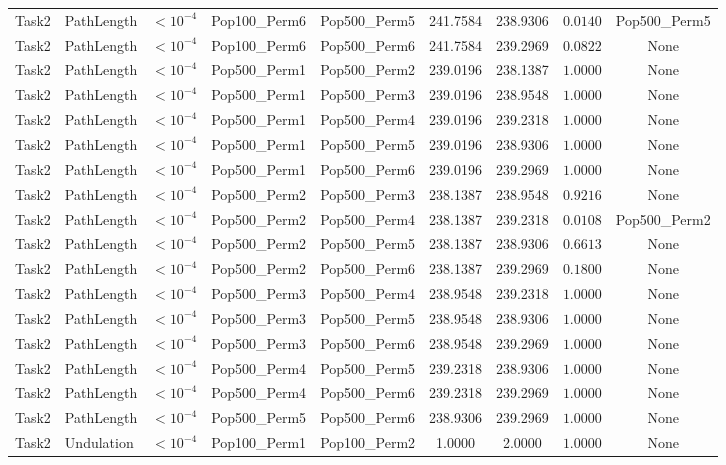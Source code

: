 \documentclass[8pt]{article}
\begin{document}
\begin{longtable}{llccccccc}
Task2 & PathLength & $< 10^{-4}$ & Pop100\_Perm6 & Pop500\_Perm5 & 241.7584 & 238.9306 & $0.0140$ & Pop500\_Perm5 \\
Task2 & PathLength & $< 10^{-4}$ & Pop100\_Perm6 & Pop500\_Perm6 & 241.7584 & 239.2969 & $0.0822$ & None \\
Task2 & PathLength & $< 10^{-4}$ & Pop500\_Perm1 & Pop500\_Perm2 & 239.0196 & 238.1387 & $1.0000$ & None \\
Task2 & PathLength & $< 10^{-4}$ & Pop500\_Perm1 & Pop500\_Perm3 & 239.0196 & 238.9548 & $1.0000$ & None \\
Task2 & PathLength & $< 10^{-4}$ & Pop500\_Perm1 & Pop500\_Perm4 & 239.0196 & 239.2318 & $1.0000$ & None \\
Task2 & PathLength & $< 10^{-4}$ & Pop500\_Perm1 & Pop500\_Perm5 & 239.0196 & 238.9306 & $1.0000$ & None \\
Task2 & PathLength & $< 10^{-4}$ & Pop500\_Perm1 & Pop500\_Perm6 & 239.0196 & 239.2969 & $1.0000$ & None \\
Task2 & PathLength & $< 10^{-4}$ & Pop500\_Perm2 & Pop500\_Perm3 & 238.1387 & 238.9548 & $0.9216$ & None \\
Task2 & PathLength & $< 10^{-4}$ & Pop500\_Perm2 & Pop500\_Perm4 & 238.1387 & 239.2318 & $0.0108$ & Pop500\_Perm2 \\
Task2 & PathLength & $< 10^{-4}$ & Pop500\_Perm2 & Pop500\_Perm5 & 238.1387 & 238.9306 & $0.6613$ & None \\
Task2 & PathLength & $< 10^{-4}$ & Pop500\_Perm2 & Pop500\_Perm6 & 238.1387 & 239.2969 & $0.1800$ & None \\
Task2 & PathLength & $< 10^{-4}$ & Pop500\_Perm3 & Pop500\_Perm4 & 238.9548 & 239.2318 & $1.0000$ & None \\
Task2 & PathLength & $< 10^{-4}$ & Pop500\_Perm3 & Pop500\_Perm5 & 238.9548 & 238.9306 & $1.0000$ & None \\
Task2 & PathLength & $< 10^{-4}$ & Pop500\_Perm3 & Pop500\_Perm6 & 238.9548 & 239.2969 & $1.0000$ & None \\
Task2 & PathLength & $< 10^{-4}$ & Pop500\_Perm4 & Pop500\_Perm5 & 239.2318 & 238.9306 & $1.0000$ & None \\
Task2 & PathLength & $< 10^{-4}$ & Pop500\_Perm4 & Pop500\_Perm6 & 239.2318 & 239.2969 & $1.0000$ & None \\
Task2 & PathLength & $< 10^{-4}$ & Pop500\_Perm5 & Pop500\_Perm6 & 238.9306 & 239.2969 & $1.0000$ & None \\
Task2 & Undulation & $< 10^{-4}$ & Pop100\_Perm1 & Pop100\_Perm2 & 1.0000 & 2.0000 & $1.0000$ & None \\

\end{longtable}
\end{document}

